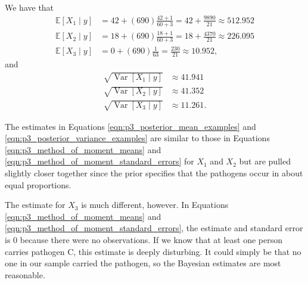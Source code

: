 \documentclass[letterpaper,11pt]{article}
\begin{document}
\begin{enumerate}
\begin{enumerate}
\begin{enumerate}
\begin{description}
        We have that
        \begin{align}
          \mathbb{E}\left[X_1 \mid y\right]
          &= 42 + \left(690\right)\frac{42 + 1}{60 + 3} = 42 + \frac{9890}{21}
            \approx 512.952 \nonumber\\
          \mathbb{E}\left[X_2 \mid y\right]
          &= 18 + \left(690\right)\frac{18 + 1}{60 + 3} = 18 + \frac{4370}{21}
            \approx 226.095 \nonumber\\
          \mathbb{E}\left[X_3 \mid y\right]
          &= 0 + \left(690\right)\frac{1}{63} = \frac{230}{21} \approx 10.952,
            \label{eqn:p3_posterior_mean_examples}
        \end{align}
        and
        \begin{align}
          \sqrt{\operatorname{Var}\left[X_1 \mid y\right]}
          &\approx 41.941 \nonumber\\
          \sqrt{\operatorname{Var}\left[X_2 \mid y\right]}
          &\approx 41.352 \nonumber\\
          \sqrt{\operatorname{Var}\left[X_3 \mid y\right]}
          &\approx 11.261.
            \label{eqn:p3_posterior_variance_examples}
        \end{align}

        The estimates in Equations \ref{eqn:p3_posterior_mean_examples} and
        \ref{eqn:p3_posterior_variance_examples} are similar to those in
        Equations \ref{eqn:p3_method_of_moment_means} and
        \ref{eqn:p3_method_of_moment_standard_errors} for $X_1$ and $X_2$ but
        are pulled slightly closer together since the prior specifies that the
        pathogens occur in about equal proportions.

        The estimate for $X_3$ is much different, however. In Equations
        \ref{eqn:p3_method_of_moment_means} and
        \ref{eqn:p3_method_of_moment_standard_errors}, the estimate and standard
        error is $0$ because there were no observations. If we know that at
        least one person carries pathogen C, this estimate is deeply
        disturbing. It could simply be that no one in our sample carried the
        pathogen, so the Bayesian estimates are most reasonable.
      \end{description}
    \end{enumerate}
  \end{enumerate}
  \end{enumerate}
\end{document}

